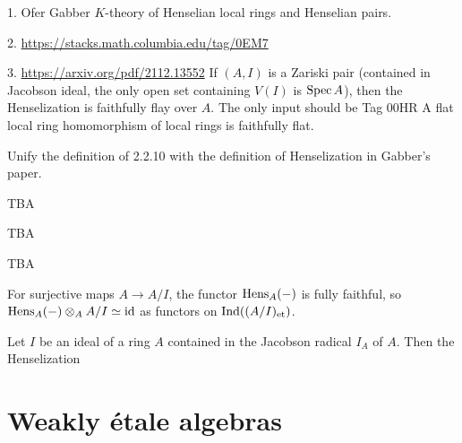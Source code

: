 1. Ofer Gabber \(K\)-theory of Henselian local rings and Henselian pairs.

2. \url{https://stacks.math.columbia.edu/tag/0EM7}

3. \url{https://arxiv.org/pdf/2112.13552} If \((A,I)\) is a Zariski pair (contained in Jacobson ideal, the only open set containing \(V(I)\) is \(\operatorname{Spec} A\)), then the Henselization is faithfully flay over \(A\). The only input should be Tag 00HR A flat local ring homomorphism of local rings is faithfully flat.

Unify the definition of 2.2.10 with the definition of Henselization in Gabber's paper.

\begin{definition}
    \label{def:henselian-pair}

    TBA
\end{definition}

\begin{definition}
    \label{def:henselization}

    TBA

\end{definition}

\begin{theorem}
    \label{thm:henselization-is-henselian}
    TBA

\end{theorem}

\begin{lemma}
    \label{lem:henselization-fully-faithful}

    For surjective maps $A \to A/I$, the functor $\operatorname{Hens}_A(-)$ is fully faithful, so $\operatorname{Hens}_A(-) \otimes_A A/I \simeq \mathrm{id}$ as functors on $\mathrm{Ind}((A/I)_{\mathrm{et}})$.
\end{lemma}


\begin{lemma}
    Let \(I\) be an ideal of a ring \(A\) contained in the Jacobson radical \(I_A\) of \(A\). Then the Henselization 
\end{lemma}

\section{Weakly étale algebras}

